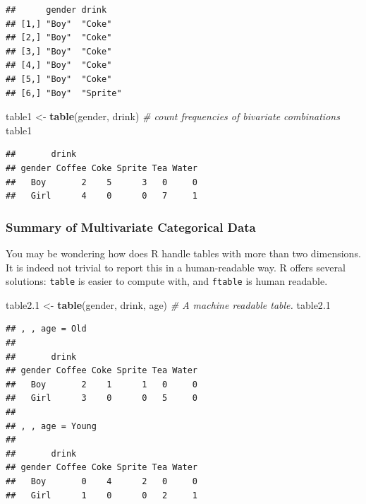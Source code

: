 \documentclass[]{book}
\newenvironment{Shaded}{\begin{snugshade}}{\end{snugshade}}
\newcommand{\CommentTok}[1]{\textcolor[rgb]{0.56,0.35,0.01}{\textit{#1}}}
\newcommand{\FloatTok}[1]{\textcolor[rgb]{0.00,0.00,0.81}{#1}}
\newcommand{\KeywordTok}[1]{\textcolor[rgb]{0.13,0.29,0.53}{\textbf{#1}}}
\newcommand{\NormalTok}[1]{#1}
\newcommand{\StringTok}[1]{\textcolor[rgb]{0.31,0.60,0.02}{#1}}
\theoremstyle{definition}
\theoremstyle{definition}
\theoremstyle{definition}
\theoremstyle{remark}
\begin{document}
\begin{verbatim}
##      gender drink   
## [1,] "Boy"  "Coke"  
## [2,] "Boy"  "Coke"  
## [3,] "Boy"  "Coke"  
## [4,] "Boy"  "Coke"  
## [5,] "Boy"  "Coke"  
## [6,] "Boy"  "Sprite"
\end{verbatim}

\begin{Shaded}
\begin{Highlighting}[]
\NormalTok{table1 <-}\StringTok{ }\KeywordTok{table}\NormalTok{(gender, drink) }\CommentTok{# count frequencies of bivariate combinations}
\NormalTok{table1                                      }
\end{Highlighting}
\end{Shaded}

\begin{verbatim}
##       drink
## gender Coffee Coke Sprite Tea Water
##   Boy       2    5      3   0     0
##   Girl      4    0      0   7     1
\end{verbatim}

\hypertarget{summary-of-multivariate-categorical-data}{%
\subsubsection{Summary of Multivariate Categorical Data}\label{summary-of-multivariate-categorical-data}}

You may be wondering how does R handle tables with more than two dimensions.
It is indeed not trivial to report this in a human-readable way.
R offers several solutions: \texttt{table} is easier to compute with, and \texttt{ftable} is human readable.

\begin{Shaded}
\begin{Highlighting}[]
\NormalTok{table2}\FloatTok{.1}\NormalTok{ <-}\StringTok{ }\KeywordTok{table}\NormalTok{(gender, drink, age) }\CommentTok{# A machine readable table. }
\NormalTok{table2}\FloatTok{.1}
\end{Highlighting}
\end{Shaded}

\begin{verbatim}
## , , age = Old
## 
##       drink
## gender Coffee Coke Sprite Tea Water
##   Boy       2    1      1   0     0
##   Girl      3    0      0   5     0
## 
## , , age = Young
## 
##       drink
## gender Coffee Coke Sprite Tea Water
##   Boy       0    4      2   0     0
##   Girl      1    0      0   2     1
\end{verbatim}
\end{document}
